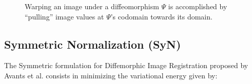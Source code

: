 \documentclass[11pt]{article}
\begin{document}
\begin{figure}[H]
\centering
{}
\caption{Warping an image under a diffeomorphism $\Psi$ is accomplished by ``pulling'' image values at $\Psi$'s codomain towards its domain.}
\label{fig:pull_back}
\end{figure}

\subsection{Symmetric Normalization (SyN)}
The Symmetric formulation for Diffemorphic Image Registration proposed by Avants et al. \cite{Avants2009} consists in minimizing the variational energy given by:
\end{document}

